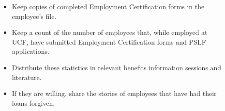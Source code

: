 \documentclass{article}
\begin{document}
\begin{description}
\item[{\parbox[t]{15cm}{\small Maintain statistics on PSLF}}] \hfill
\vspace*{-1cm}
\begin{itemize}
\item Keep copies of completed Employment Certification forms in the employee's file.

                \item Keep a count of the number of employees that, while employed at UCF, have submitted Employment Certification forms and PSLF applications.

                \item Distribute these statistics in relevant benefits information sessions and literature.

                \item If they are willing, share the stories of employees that have had their loans forgiven.
\end{itemize}
\end{description}
\end{document}
